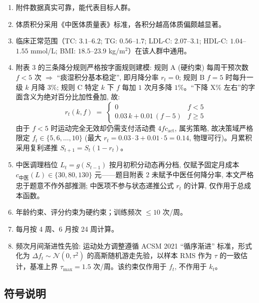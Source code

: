 \documentclass{MathorCupmodeling}
\providecommand{\tightlist}{%
  \setlength{\itemsep}{0pt}\setlength{\parskip}{0pt}}
\begin{document}
\begin{enumerate}
\def\labelenumi{\arabic{enumi}.}
\tightlist
\item 附件数据真实可靠，能代表目标人群。
\item 体质积分采用《中医体质量表》标准，各积分越高体质偏颇越显著。
\item 临床正常范围（TC: $3.1$--$6.2$; TG: $0.56$--$1.7$; LDL-C: $2.07$--$3.1$; HDL-C: $1.04$--$1.55$ mmol/L; BMI: $18.5$--$23.9$ kg/m$^2$）在该人群中通用。
\item 附表 3 的三条降分规则严格按字面规则建模: 规则 A (硬约束) 每周干预次数 $f<5$ 次 $\Rightarrow$ ``痰湿积分基本稳定'', 即月降分率 $r_t=0$; 规则 B $f=5$ 时每升一级 $k$ 月降 $3\%$; 规则 C 特定 $k$ 下 $f$ 每加 $1$ 次月多降 $1\%$。``下降 X\% 左右''的字面含义为绝对百分比加性叠加, 故:
\[
r_t(k,f) \;=\; \begin{cases}0 & f<5 \\ 0.03\,k + 0.01\,(f-5) & f\ge 5\end{cases}
\]
由于 $f<5$ 时运动完全无效却仍需支付活动费 $4f c_{\text{act}}$, 属劣策略, 故决策域严格限定 $f_t\in\{5,6,\dots,10\}$ (最大 $r_t=0.03\cdot 3+0.01\cdot 5=0.14$, 物理可行)。月累积采用复利递推 $S_{t+1}=S_t(1-r_t)$。
\item 中医调理档位 $L_t=g(S_{t-1})$ 按月初积分动态再分档, 仅赋予固定月成本 $c_{\text{中医}}(L)\in\{30,80,130\}$ 元——题目附表 2 未赋予中医任何降分率, 本文严格忠于题意不作外部推测; 中医项不参与状态递推公式 $r_t$ 的计算, 仅作用于总成本函数。
\item 年龄约束、评分约束为硬约束；训练频次 $\le 10$ 次/周。
\item 每月按 4 周、6 月按 24 周计算。
\item 频次月间渐进性先验: 运动处方调整遵循 ACSM 2021 “循序渐进” 标准\cite{acsm2021, garber2011}，形式化为 $\Delta f_t \sim \mathcal{N}(0, \tau^2)$ 的高斯随机游走先验，以样本 RMS 作为 $\tau$ 的一致估计，基准上界 $\tau_{\max}=1.5$ 次/周。该约束仅作用于 $f_t$, 不作用于 $k_t$。
\end{enumerate}

\subsection{符号说明}
\end{document}
